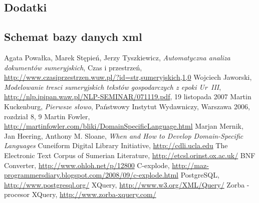 \documentclass{pracamgr}
\begin{document}
\begin{appendix}
\part*{Dodatki}

\chapter{Schemat bazy danych xml}
\label{appendix:xmlsch}





\end{appendix}

\begin{thebibliography}{99}
 Agata Powałka, Marek Stępień, Jerzy Tyszkiewicz, \textit{Automatyczna analiza dokumentów sumeryjskich}, 
Czas i przestrzeń, \url{http://www.czasiprzestrzen.wuw.pl/?id=str,sumeryjskich,1,0}
 Wojciech Jaworski, \textit{Modelowanie tresci sumeryjskich tekstów gospodarczych z epoki Ur~III}, 
\url{http://nlp.ipipan.waw.pl/NLP-SEMINAR/071119.pdf}, 19 listopada 2007
 Martin Kuckenburg, \textit{Pierwsze słowo}, Państwowy Instytut Wydawniczy, Warszawa 2006, rozdział 8, 9
 Martin Fowler, \url{http://martinfowler.com/bliki/DomainSpecificLanguage.html}
 Marjan Mernik, Jan Heering, Anthony M. Sloane, \textit{When and How to Develop Domain-Specific Languages}
 Cuneiform Digital Library Initiative, \url{http://cdli.ucla.edu}
 The Electronic Text Corpus of Sumerian Literature, \url{http://etcsl.orinst.ox.ac.uk/}
 BNF Converter, \url{http://www.ohloh.net/p/12800} %
 C-explode, \url{http://maz-programmersdiary.blogspot.com/2008/09/c-explode.html}
 PostgreSQL, \url{http://www.postgresql.org/}
 XQuery, \url{http://www.w3.org/XML/Query/}
 Zorba - procesor XQuery, \url{http://www.zorba-xquery.com/}



\end{thebibliography}

\listoffigures
\end{document}
